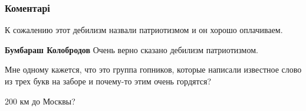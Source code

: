  
 
 
 
 
\subsubsection{Коментарі}
\label{sec:22_08_2021.fb.berdnik_miroslava.1.goncharenko_ukazateli_nezalezhnist.cmt}

\begin{itemize}
 
К сожалению этот дебилизм назвали патриотизмом и он хорошо оплачиваем.

\begin{itemize}
 
\textbf{Бумбараш Колобродов} Очень верно сказано дебилизм патриотизмом.
\end{itemize}

 
Мне одному кажется, что это группа гопников, которые написали известное слово из трех букв на заборе и почему-то этим очень гордятся?

 
200 км до Москвы?


\end{itemize}
